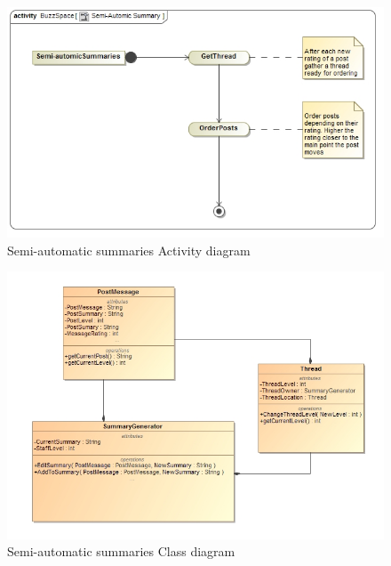 \documentclass[11pt]{article}
\begin{document}
\begin{enumerate}
\begin{itemize}
			 	  					 	  		\begin{figure}[H]	
			 	  					 	  			\includegraphics[scale=0.5]{B3Activity.png}
			 	  									\caption{Semi-automatic summaries Activity diagram}
			 	  					 	  		\end{figure}
			 	  					 	  		
			 	  					 	  					 	  		
			 	  					 	  					 	  					 	  		\begin{figure}[H]	
			 	  					 	  					 	  					 	  			\includegraphics[scale=0.5]{B3ClassDiagram.png}
			 	  					 	  					 	  									\caption{Semi-automatic summaries Class diagram}
			 	  					 	  					 	  					 	  		\end{figure}
	\newpage
			
			 
				
\end{itemize}	

\newpage




\end{enumerate}
\end{document}
